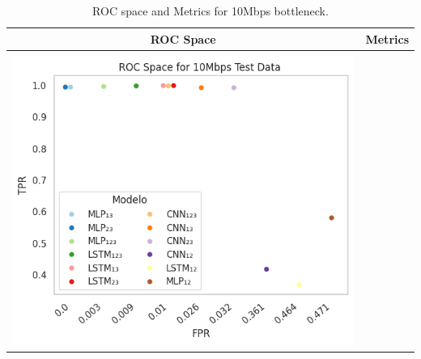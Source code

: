 











\begingroup
\setlength{\tabcolsep}{0.5pt} %

\begin{table}
	\centering
	\caption{ROC space and Metrics for 10Mbps bottleneck.}	
	\begin{tabular*}{\textwidth}{@{} CC@{} }
		\hline
		\toprule
		ROC Space & Metrics \\ \hline
		\midrule	
		& \\
		
		\begin{minipage}{0.55\textwidth}
			
			\hspace{0.5cm}
			\includegraphics[width=.60\textwidth]{./figs/ROC-Space-Test-Data-10Mbps.png}
			\subcaption{ }
			\label{fig:desempenhoteste}
		\end{minipage}
		\hfil
		&
		\begin{minipage}{0.45\textwidth}
			\begingroup
			\begin{tiny}	
				\setlength{\tabcolsep}{3pt}
				\renewcommand{\arraystretch}{1.15}
				

\end{tiny}
\end{minipage}
\end{tabular*}
\end{table}
